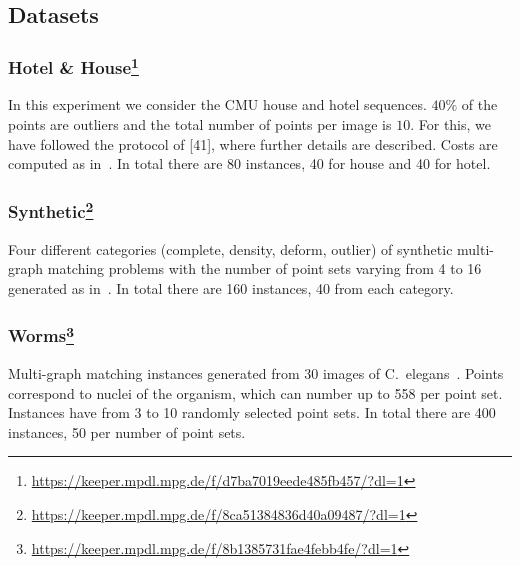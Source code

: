 \subsection{Datasets}

\subsubsection[Hotel \& House]{Hotel \& House\footnote{\url{https://keeper.mpdl.mpg.de/f/d7ba7019eede485fb457/?dl=1}}}
In this experiment we consider the CMU house and hotel sequences.
$40\%$ of the points are outliers and the total number of points per image is $10$. 
For this, we have followed the protocol of [41], where further details are described.
Costs are computed as in~\cite{yan2015multi}.
In total there are 80 instances, 40 for house and 40 for hotel.

\subsubsection[Synthetic]{Synthetic\footnote{\url{https://keeper.mpdl.mpg.de/f/8ca51384836d40a09487/?dl=1}}}
Four different categories (complete, density, deform, outlier) of synthetic multi-graph matching problems with the number of point sets varying from 4 to 16 generated as in~\cite{yan2015multi}.
In total there are 160 instances, 40 from each category.

\subsubsection[Worms]{Worms\footnote{\url{https://keeper.mpdl.mpg.de/f/8b1385731fae4febb4fe/?dl=1}}}
Multi-graph matching instances generated from 30 images of C.\ elegans~\cite{kainmueller2014active}.
Points correspond to nuclei of the organism, which can number up to 558 per point set.
Instances have from 3 to 10 randomly selected point sets.
In total there are 400 instances, 50 per number of point sets.

